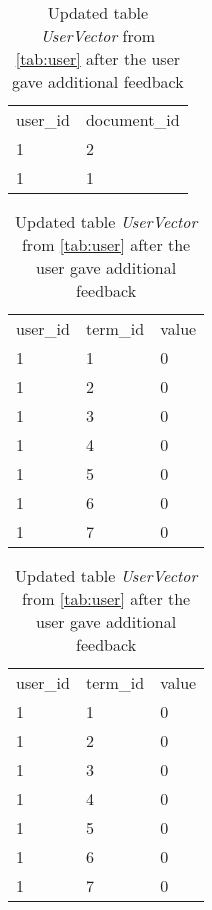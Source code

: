 \begin{table}
    \begin{tabular}{ l | l }
        \rowcolor{\dustRowHead}
        \multicolumn{2}{c}{UserPreference}\\\hline
        user\_id    & document\_id\\\hline
        1           & 2\\
        1           & 1\\
    \end{tabular}
    \hfill
    \begin{tabular}{ l | l | l }
        \rowcolor{\dustRowHead}
        \multicolumn{3}{c}{UserVector ($\text{q}_0$)}\\\hline
        user\_id    & term\_id  & value\\\hline
        1           & 1         & 0\\
        1           & 2         & 0\\
        1           & 3         & 0\\
        1           & 4         & 0\\
        1           & 5         & 0\\
        1           & 6         & 0\\
        1           & 7         & 0\\
    \end{tabular}


    \hfill
    \begin{tabular}{ l | l | l }
        \rowcolor{\dustRowHead}
        \multicolumn{3}{c}{UserVector ($\text{q}_\text{m}$)}\\\hline
        user\_id    & term\_id  & value\\\hline
        1           & 1         & 0\\
        1           & 2         & 0\\
        1           & 3         & 0\\
        1           & 4         & 0\\
        1           & 5         & 0\\
        1           & 6         & 0\\
        1           & 7         & 0\\
    \end{tabular}
    \caption{Updated table \textit{UserVector} from \ref{tab:user} after the user gave additional feedback}
    \label{tab:user_updated}
\end{table}



